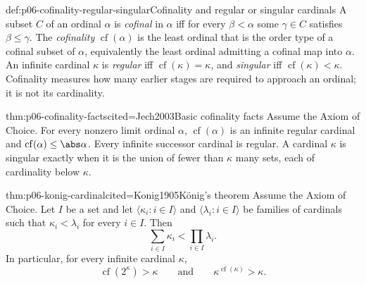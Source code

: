 \begin{hbdefinition}{def:p06-cofinality-regular-singular}{Cofinality and regular or singular cardinals}
A subset \(C\) of an ordinal \(\alpha\) is \emph{cofinal} in \(\alpha\) iff
for every \(\beta<\alpha\) some \(\gamma\in C\) satisfies
\(\beta\leq\gamma\).  The \emph{cofinality} \(\operatorname{cf}(\alpha)\)
is the least ordinal that is the order type of a cofinal subset of \(\alpha\),
equivalently the least ordinal admitting a cofinal map into \(\alpha\).
An infinite cardinal \(\kappa\) is \emph{regular} iff
\(\operatorname{cf}(\kappa)=\kappa\), and \emph{singular} iff
\(\operatorname{cf}(\kappa)<\kappa\).  Cofinality measures how many earlier
stages are required to approach an ordinal; it is not its cardinality.
\end{hbdefinition}

\begin{hbtheorem}{thm:p06-cofinality-facts}{cited=Jech2003}{Basic cofinality facts}
Assume the Axiom of Choice.  For every nonzero limit ordinal \(\alpha\),
\(\operatorname{cf}(\alpha)\) is an infinite regular cardinal and
\(\operatorname{cf}(\alpha)\leq\abs\alpha\).  Every infinite successor
cardinal is regular.  A cardinal \(\kappa\) is singular exactly when it is the
union of fewer than \(\kappa\) many sets, each of cardinality below
\(\kappa\).
\end{hbtheorem}

\begin{hbtheorem}{thm:p06-konig-cardinal}{cited=Konig1905}{K\"onig's theorem}
Assume the Axiom of Choice.  Let \(I\) be a set and let
\(\langle\kappa_i:i\in I\rangle\) and
\(\langle\lambda_i:i\in I\rangle\) be families of cardinals such that
\(\kappa_i<\lambda_i\) for every \(i\in I\).  Then
\[
  \sum_{i\in I}\kappa_i
  <
  \prod_{i\in I}\lambda_i.
\]
In particular, for every infinite cardinal \(\kappa\),
\[
  \operatorname{cf}(2^\kappa)>\kappa
  \qquad\text{and}\qquad
  \kappa^{\operatorname{cf}(\kappa)}>\kappa.
\]
\end{hbtheorem}

